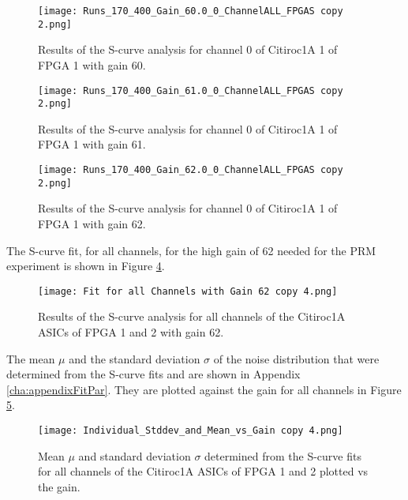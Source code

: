     \begin{figure}[H]
        \centering
        \texttt{[image: Runs\_170\_400\_Gain\_60.0\_0\_ChannelALL\_FPGAS copy 2.png]}
        \caption{Results of the S-curve analysis for channel 0 of Citiroc1A 1 of FPGA 1 with gain 60.}
        \label{fig:S_curve_60}
    \end{figure}
    \begin{figure}[H]
        \centering
        \texttt{[image: Runs\_170\_400\_Gain\_61.0\_0\_ChannelALL\_FPGAS copy 2.png]}
        \caption{Results of the S-curve analysis for channel 0 of Citiroc1A 1 of FPGA 1 with gain 61.}
        \label{fig:S_curve_61}
    \end{figure}
    \begin{figure}[H]
        \centering
        \texttt{[image: Runs\_170\_400\_Gain\_62.0\_0\_ChannelALL\_FPGAS copy 2.png]}
        \caption{Results of the S-curve analysis for channel 0 of Citiroc1A 1 of FPGA 1 with gain 62.}
        \label{fig:S_curve_62}
    \end{figure}
    The S-curve fit, for all channels, for the high gain of 62 needed for the PRM experiment is shown in Figure \ref{fig:S_curve_62_ALL}. 
    
    \begin{figure}[H]
        \centering
        \texttt{[image: Fit for all Channels with Gain 62 copy 4.png]}
        \caption{Results of the S-curve analysis for all channels of the Citiroc1A ASICs of FPGA 1 and 2 with gain 62.}
        \label{fig:S_curve_62_ALL}
    \end{figure}
    The mean $\mu$ and the standard deviation $\sigma$ of the noise distribution that were determined from the S-curve fits and are shown in Appendix \ref{cha:appendixFitPar}.
    They are plotted against the gain for all channels in Figure \ref{fig:Mean vs gain}.
    \begin{figure}[H]
        \centering
        \texttt{[image: Individual\_Stddev\_and\_Mean\_vs\_Gain copy 4.png]}
        \caption{Mean $\mu$ and standard deviation $\sigma$ determined from the S-curve fits for all channels of the Citiroc1A ASICs of FPGA 1 and 2 plotted vs the gain.}
        \label{fig:Mean vs gain}
    \end{figure}
    
